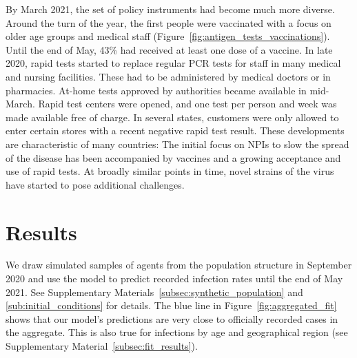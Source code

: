 \begin{figure}[!tp]
\end{figure}

By March 2021, the set of policy instruments had become much more diverse. Around the
turn of the year, the first people were vaccinated with a focus on older age groups and
medical staff (Figure~\ref{fig:antigen_tests_vaccinations}). Until the end of May, 43\%
had received at least one dose of a vaccine. In late 2020, rapid tests started to
replace regular PCR tests for staff in many medical and nursing facilities. These had to
be administered by medical doctors or in pharmacies. At-home tests approved by
authorities became available in mid-March. Rapid test centers were opened, and one test
per person and week was made available free of charge. In several states, customers were
only allowed to enter certain stores with a recent negative rapid test result. These
developments are characteristic of many countries: The initial focus on NPIs to slow the
spread of the disease has been accompanied by vaccines and a growing acceptance and use
of rapid tests. At broadly similar points in time, novel strains of the virus have
started to pose additional challenges.

\section*{Results}

We draw simulated samples of agents from the population structure in September 2020 and
use the model to predict recorded infection rates until the end of May 2021. See
Supplementary Materials~\ref{subsec:synthetic_population} and
\ref{sub:initial_conditions} for details. The blue line in
Figure~\ref{fig:aggregated_fit} shows that our model's predictions are very close to
officially recorded cases in the aggregate. This is also true for infections by age and
geographical region (see Supplementary Material~\ref{subsec:fit_results}).

